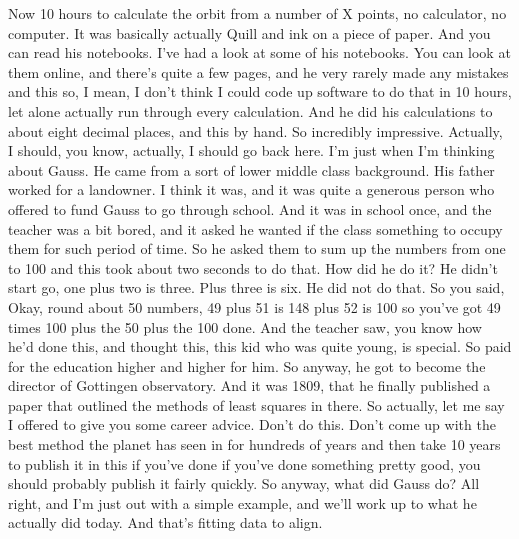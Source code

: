 \documentclass[11pt,a4paper]{article}
\begin{document}
Now 10 hours to calculate the orbit from a number of X points, no calculator, no computer. It was basically actually Quill and ink on a piece of paper. And you can read his notebooks. I've had a look at some of his notebooks. You can look at them online, and there's quite a few pages, and he very rarely made any mistakes and this so, I mean, I don't think I could code up software to do that in 10 hours, let alone actually run through every calculation. And he did his calculations to about eight decimal places, and this by hand. So incredibly impressive. Actually, I should, you know, actually, I should go back here. I'm just when I'm thinking about Gauss. He came from a sort of lower middle class background. His father worked for a landowner. I think it was, and it was quite a generous person who offered to fund Gauss to go through school. And it was in school once, and the teacher was a bit bored, and it asked he wanted if the class something to occupy them for such period of time. So he asked them to sum up the numbers from one to 100 and this took about two seconds to do that. How did he do it? He didn't start go, one plus two is three. Plus three is six. He did not do that. So you said, Okay, round about 50 numbers, 49 plus 51 is 148 plus 52 is 100 so you've got 49 times 100 plus the 50 plus the 100 done. And the teacher saw, you know how he'd done this, and thought this, this kid who was quite young, is special. So paid for the education higher and higher for him. So anyway, he got to become the director of Gottingen observatory. And it was 1809, that he finally published a paper that outlined the methods of least squares in there. So actually, let me say I offered to give you some career advice. Don't do this. Don't come up with the best method the planet has seen in for hundreds of years and then take 10 years to publish it in this if you've done if you've done something pretty good, you should probably publish it fairly quickly. So anyway, what did Gauss do? All right, and I'm just out with a simple example, and we'll work up to what he actually did today. And that's fitting data to align.
\end{document}
